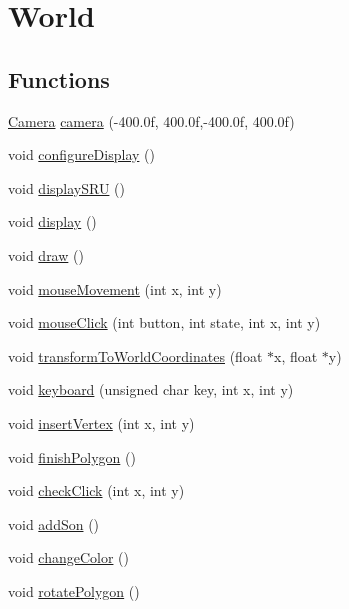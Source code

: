 \hypertarget{group___world}{}\section{World}
\label{group___world}
\subsection*{Functions}
\begin{DoxyCompactItemize}
\item 
\hyperlink{class_camera}{Camera} \hyperlink{group___world_ga4afca247c0c56ea79cab1370b887b97f}{camera} (-\/400.\+0f, 400.\+0f,-\/400.\+0f, 400.\+0f)
\item 
void \hyperlink{group___world_gadc96c15b765be7e51c8567b0c00cb13d}{configure\+Display} ()
\item 
void \hyperlink{group___world_gaca1e6f446c874037ee430d8dd81700b3}{display\+S\+R\+U} ()
\item 
void \hyperlink{group___world_ga1e5b20fed15743656bb6d2e6a6ea6269}{display} ()
\item 
void \hyperlink{group___world_ga56c5cf8a568cff737ff95520cbe6b405}{draw} ()
\item 
void \hyperlink{group___world_ga478744e774e214e5e3bd22b94de5dba1}{mouse\+Movement} (int x, int y)
\item 
void \hyperlink{group___world_ga125707cf235695f4eb006113f0c01265}{mouse\+Click} (int button, int state, int x, int y)
\item 
void \hyperlink{group___world_ga506cb7eed81ca20c2d30c8c9a6ab7ed6}{transform\+To\+World\+Coordinates} (float $\ast$x, float $\ast$y)
\item 
void \hyperlink{group___world_gaef7ba2f69afb2d954545f64c7fe24b14}{keyboard} (unsigned char key, int x, int y)
\item 
void \hyperlink{group___world_ga6d1aed2e4b93b83f26470bf04279db2f}{insert\+Vertex} (int x, int y)
\item 
void \hyperlink{group___world_ga44a731ee054c222a204148a6a9857e0c}{finish\+Polygon} ()
\item 
void \hyperlink{group___world_ga591ee54a6594a1e52a0ff6e8b5db53a2}{check\+Click} (int x, int y)
\item 
void \hyperlink{group___world_ga96e10f0621a73bc0772fa77f678dc9f1}{add\+Son} ()
\item 
void \hyperlink{group___world_ga439564eafcd273e899793b6ac613cedb}{change\+Color} ()
\item 
void \hyperlink{group___world_ga79eda5216413cbd6774852aaa0bdc74c}{rotate\+Polygon} ()

\end{DoxyCompactItemize}
